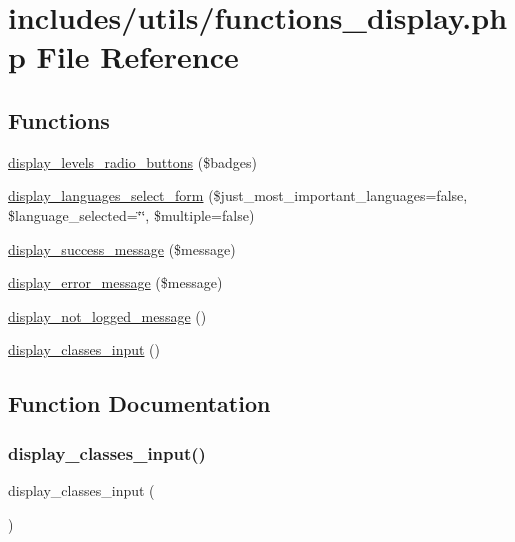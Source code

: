 \hypertarget{functions__display_8php}{}\section{includes/utils/functions\+\_\+display.php File Reference}
\label{functions__display_8php}
\subsection*{Functions}
\begin{DoxyCompactItemize}
\item 
\hyperlink{functions__display_8php_a7608fc1b591558866c58dd0fd75f07ec}{display\+\_\+levels\+\_\+radio\+\_\+buttons} (\$badges)
\item 
\hyperlink{functions__display_8php_a25ff2818847c3022484d4f99ec37f49e}{display\+\_\+languages\+\_\+select\+\_\+form} (\$just\+\_\+most\+\_\+important\+\_\+languages=false, \$language\+\_\+selected=\char`\"{}\char`\"{}, \$multiple=false)
\item 
\hyperlink{functions__display_8php_ac860f96ee2a59ae91c0ca9557238c265}{display\+\_\+success\+\_\+message} (\$message)
\item 
\hyperlink{functions__display_8php_ae2ac52dd805785434ad86413e9215d73}{display\+\_\+error\+\_\+message} (\$message)
\item 
\hyperlink{functions__display_8php_abb54a4de1df89b2139ead8d0a85716f3}{display\+\_\+not\+\_\+logged\+\_\+message} ()
\item 
\hyperlink{functions__display_8php_a507c4b26048fdf68b7c8a5a576d35ee2}{display\+\_\+classes\+\_\+input} ()
\end{DoxyCompactItemize}


\subsection{Function Documentation}
\mbox{\label{functions__display_8php_a507c4b26048fdf68b7c8a5a576d35ee2}} 
\subsubsection{\texorpdfstring{display\+\_\+classes\+\_\+input()}{display\_classes\_input()}}
{\footnotesize\ttfamily display\+\_\+classes\+\_\+input (\begin{DoxyParamCaption}{ }\end{DoxyParamCaption})}

